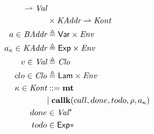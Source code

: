 \documentclass[12pt,draft]{article}
\begin{document}
\begin{multicols*}{2}
\begin{align*}
                                 \rightharpoonup \textit{Val} \\
    & \times \textit{KAddr} \rightharpoonup \textit{Kont} \\
    a \in \textit{BAddr} &\triangleq \textsf{Var} \times \textit{Env} \\
    a_{\kappa} \in \textit{KAddr} &\triangleq \textsf{Exp} \times \textit{Env} \\
    v \in \textit{Val} &\triangleq \textit{Clo} \\
    clo \in \textit{Clo} &\triangleq \textsf{Lam} \times \textit{Env} \\
    \kappa \in \textit{Kont} &::= \textbf{mt} \\
                         &| \; \textbf{callk}(call,done,todo,\rho,a_{\kappa}) \\
    done &\in \textit{Val}^* \\
    todo &\in \textsf{Exp}* \\
  \end{align*}
\end{multicols*}


\newpage
\end{document}
